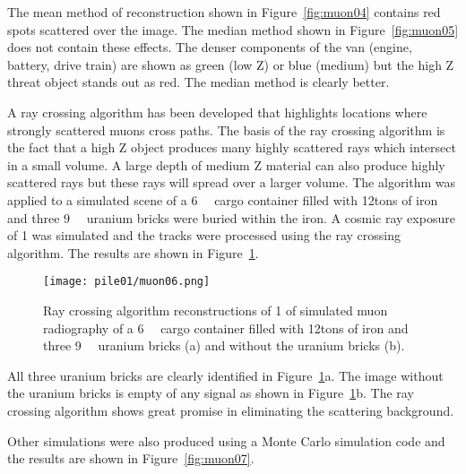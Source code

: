 \documentclass[twoside,titlepage,11pt,twocolumn,a4paper]{article}
\begin{document}
The mean method of reconstruction shown in Figure~\ref{fig:muon04}
contains red spots scattered over the image.  The median method shown
in Figure~\ref{fig:muon05} does not contain these effects. The denser
components of the van (engine, battery, drive train) are shown as
green (low Z) or blue (medium) but the high Z threat object stands out
as red. The median method is clearly better. \citep{statisticalRec2007}

A ray crossing algorithm has been developed that highlights locations
where strongly scattered muons cross paths. The basis of the ray
crossing algorithm is the fact that a high Z object produces many
highly scattered rays which intersect in a small volume. A large depth
of medium Z material can also produce highly scattered rays but these
rays will spread over a larger volume. The algorithm was applied to a
simulated scene of a \unit{6}{\cubic\metre} cargo
container filled with \unit{12}{tons} of iron and three
\unit{9}{\cubic{\centi\metre}} uranium bricks were
buried within the iron. A cosmic ray exposure of \unit{1}{\minute} was
simulated and the tracks were processed using the ray crossing
algorithm. The results are shown in Figure~\ref{fig:muon06}. \citep{imageRec2004}

\begin{figure}
  \texttt{[image: pile01/muon06.png]}
  \caption{Ray crossing algorithm reconstructions of \unit{1}{\minute}
    of simulated muon radiography of a
    \unit{6}{\cubic\metre} cargo container filled
    with \unit{12}{tons} of iron and three
    \unit{9}{\cubic{\centi\metre}} uranium bricks (a)
    and without the uranium bricks (b). \citep{imageRec2004}}
  \label{fig:muon06}
\end{figure}

All three uranium bricks are clearly identified in
Figure~\ref{fig:muon06}a. The image without the uranium bricks is empty of
any signal as shown in Figure~\ref{fig:muon06}b. The ray crossing
algorithm shows great promise in eliminating the scattering
background. \citep{imageRec2004}

Other simulations were also produced using a Monte Carlo simulation
code and the results are shown in Figure~\ref{fig:muon07}.
\end{document}

